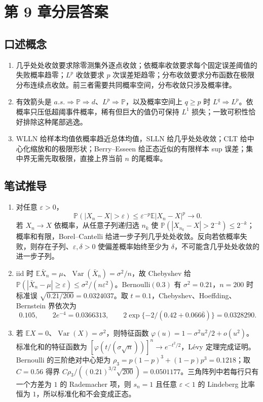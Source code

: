 \chapter{第 9 章分层答案}
\label{app:ch09-solutions}

\section*{口述概念}
\begin{enumerate}[leftmargin=*]
  \item 几乎处处收敛要求除零测集外逐点收敛；依概率收敛要求每个固定误差阈值的失败概率趋零；$L^p$ 收敛要求 $p$ 次误差矩趋零；分布收敛要求分布函数在极限分布连续点收敛。前三者需要共同概率空间，分布收敛只涉及概率律。
  \item 有效箭头是 $a.s.\Rightarrow\mathbb P\Rightarrow d$、$L^p\Rightarrow\mathbb P$，以及概率空间上 $q\ge p$ 时 $L^q\Rightarrow L^p$。依概率只压低超阈事件概率，稀有但巨大的值仍可保持 $L^1$ 损失；一致可积性恰好排除这种尾部逃逸。
  \item WLLN 给样本均值依概率趋近总体均值，SLLN 给几乎处处收敛；CLT 给中心化缩放和的极限形状；Berry--Esseen 给正态近似的有限样本 sup 误差；集中界无需先取极限，直接上界当前 $n$ 的尾概率。
\end{enumerate}

\section*{笔试推导}
\begin{enumerate}[leftmargin=*]
  \item 对任意 $\varepsilon>0$，
  \[
    \mathbb P(|X_n-X|>\varepsilon)
    \le \varepsilon^{-p}\mathbb E|X_n-X|^p\to0.
  \]
  若 $X_n\to X$ 依概率，从任意子列递归选 $n_k$ 使
  $\mathbb P(|X_{n_k}-X|>2^{-k})\le2^{-k}$；概率和有限，Borel--Cantelli 给进一步子列几乎处处收敛。反向若依概率失败，则存在子列、$\varepsilon,\delta>0$ 使偏差概率始终至少为 $\delta$，不可能含几乎处处收敛的进一步子列。
  \item iid 时
  $\mathbb E\bar X_n=\mu$、$\operatorname{Var}(\bar X_n)=\sigma^2/n$，故 Chebyshev 给
  $\mathbb P(|\bar X_n-\mu|\ge\varepsilon)\le\sigma^2/(n\varepsilon^2)$。Bernoulli$(0.3)$ 有 $\sigma^2=0.21$，$n=200$ 时标准误
  $\sqrt{0.21/200}=0.0324037$。取 $t=0.1$，Chebyshev、Hoeffding、Bernstein 界依次为
  \[
    0.105,\qquad 2e^{-4}=0.0366313,\qquad
    2\exp\{-2/(0.42+0.066\overline6)\}=0.0328290.
  \]
  \item 若 $\mathbb EX=0$、$\operatorname{Var}(X)=\sigma^2$，则特征函数
  $\varphi(u)=1-\sigma^2u^2/2+o(u^2)$。标准化和的特征函数为
  $[\varphi(t/(\sigma\sqrt n))]^n\to e^{-t^2/2}$，Lévy 定理完成证明。Bernoulli 的三阶绝对中心矩为
  $\rho_3=p(1-p)^3+(1-p)p^3=0.1218$；取 $C=0.56$ 得界
  $C\rho_3/((0.21)^{3/2}\sqrt{200})=0.0501177$。三角阵列中若每行只有一个方差为 $1$ 的 Rademacher 项，则 $s_n=1$ 且任意 $\varepsilon<1$ 的 Lindeberg 比率恒为 $1$，所以标准化和不会变成正态。
\end{enumerate}

